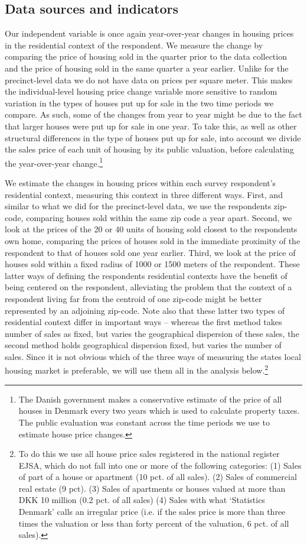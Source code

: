 \documentclass[12pt,a4paper]{article}
\begin{document}
\subsection{Data sources and indicators}
Our independent variable is once again year-over-year changes in housing prices in the residential context of the respondent. We measure the change by comparing the price of housing sold in the quarter prior to the data collection and the price of housing sold in the same quarter a year earlier. Unlike for the precinct-level data  we do not have data on prices per square meter. This makes the individual-level housing price change variable more sensitive to random variation in the types of houses put up for sale in the two time periods we compare. As such, some of the changes from year to year might be due to the fact that larger houses were put up for sale in one year. To take this, as well as other structural differences in the type of houses put up for sale, into account we divide the sales price of each unit of housing by its public valuation, before calculating the year-over-year change.\footnote{The Danish government makes a conservative estimate of the price of all houses in Denmark every two years which is used to calculate property taxes. The public evaluation was constant across the time periods we use to estimate house price changes.} 

We estimate the changes in housing prices within each survey respondent's residential context, measuring this context  in three different ways. First, and similar to what we did for the precinct-level data, we use the respondents zip-code, comparing houses sold within the same zip code a year apart. Second, we look at the prices of the 20 or 40 units of housing sold closest to the respondents own home, comparing the prices of houses sold in the immediate proximity of the respondent to that of houses sold one year earlier. Third, we look at the price of houses sold within a fixed radius of 1000 or 1500 meters of the respondent. These latter ways of defining the respondents residential contexts have the benefit of being centered on the respondent, alleviating the problem that the context of a respondent living far from the centroid of one zip-code might be better represented by an adjoining zip-code. Note also that these latter two types of residential context differ in important ways -- whereas the first method takes number of sales as fixed, but varies the geographical dispersion of these sales, the second method holds geographical dispersion fixed, but varies the number of sales. Since it is not obvious which of the three ways of measuring the states local housing market is preferable, we will use them all in the analysis below.\footnote{To do this we use all house price sales registered in the national register EJSA, which do not fall into one or more of the following categories: (1) Sales of part of a house or apartment (10 pct. of all sales). (2) Sales of commercial real estate (9 pct). (3) Sales of apartments or houses valued at more than DKK 10 million (0.2 pct. of all sales) (4) Sales with what `Statistics Denmark' calls an irregular price (i.e. if the sales price is more than three times the valuation or less than forty percent of the valuation, 6 pct. of all sales).}
\end{document}
